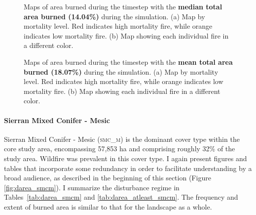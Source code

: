 \begin{figure}[!htbp]
  \centering
  \caption{Maps of area burned during the timestep with the \textbf{median total area burned (14.04\%)} during the simulation. (a) Map by mortality level. Red indicates high mortality fire, while orange indicates low mortality fire. (b) Map showing each individual fire in a different color.}
  \label{fig:darea_median_map}
\end{figure}

\begin{figure}[!htbp]
  \centering
  \caption{Maps of area burned during the timestep with the \textbf{mean total area burned (18.07\%)} during the simulation. (a) Map by mortality level. Red indicates high mortality fire, while orange indicates low mortality fire. (b) Map showing each individual fire in a different color.}
  \label{fig:darea_mean_map}
\end{figure}

\clearpage


\paragraph*{Sierran Mixed Conifer - Mesic}
Sierran Mixed Conifer - Mesic (\textsc{smc\_m}) is the dominant cover type within the core study area, encompassing 57,853 ha and comprising roughly 32\% of the study area. Wildfire was prevalent in this cover type. I again present figures and tables that incorporate some redundancy in order to facilitate understanding by a broad audience, as described in the beginning of this section (Figure \ref{fig:darea_smcm}). I summarize the disturbance regime in Tables~\ref{tab:darea_smcm} and \ref{tab:darea_atleast_smcm}. The frequency and extent of burned area is similar to that for the landscape as a whole.

